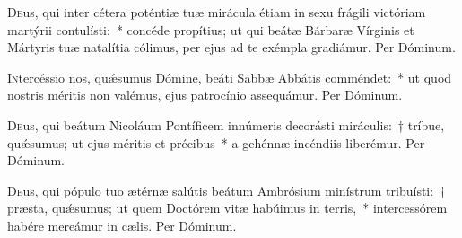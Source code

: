 \documentclass[vesperale_romanum.tex]{subfiles}
\begin{document}

\oratio

\lettrine{D}{e}us, qui inter cétera poténtiæ tuæ mirácula étiam in sexu frágili vi\-ctóriam martýrii contulísti:~* concéde propítius; ut qui beátæ Bárbaræ Vírginis et Mártyris tuæ natalítia cólimus, per ejus ad te exémpla gradiámur. Per Dóminum.


\myrule



\oratio

\lettrine{I}{n}tercéssio nos, quǽsumus Dómine, beáti Sabbæ Abbátis comméndet:~* ut quod nostris méritis non valémus, ejus patrocínio assequámur. Per Dóminum.

\myrule


\duplex

\oratio

\lettrine{D}{e}us, qui beátum Nicoláum Pontíficem innúmeris decorásti miráculis:~† tríbue, quǽsumus; ut ejus méritis et précibus~* a gehénnæ incéndiis liberémur. Per Dóminum.

\myrule


\duplexmtv


\oratio

\lettrine{D}{e}us, qui pópulo tuo ætérnæ salútis beátum Ambrósium minístrum tribuísti:~† præsta, quǽsumus; ut quem Do\-ctórem vitæ habúimus in terris,~* intercessórem habére mereámur in cælis. Per Dóminum.

\end{document}
